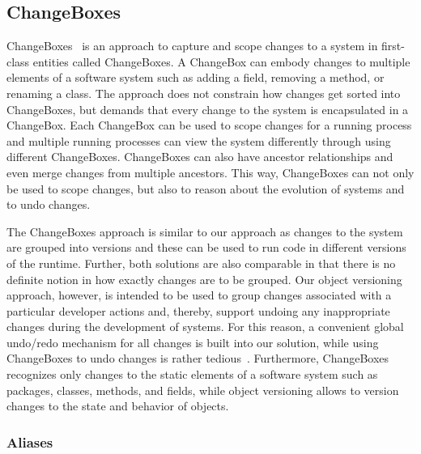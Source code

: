 \subsection{ChangeBoxes}

ChangeBoxes~\cite{Denker2007EEC} is an approach to capture and scope changes to a system in first-class entities called ChangeBoxes.
A ChangeBox can embody changes to multiple elements of a software system such as adding a field, removing a method, or renaming a class.
The approach does not constrain how changes get sorted into ChangeBoxes, but demands that every change to the system is encapsulated in a ChangeBox.
Each ChangeBox can be used to scope changes for a running process and multiple running processes can view the system differently through using different ChangeBoxes.
ChangeBoxes can also have ancestor relationships and even merge changes from multiple ancestors.
This way, ChangeBoxes can not only be used to scope changes, but also to reason about the evolution of systems and to undo changes.

The ChangeBoxes approach is similar to our approach as changes to the system are grouped into versions and these can be used to run code in different versions of the runtime.
Further, both solutions are also comparable in that there is no definite notion in how exactly changes are to be grouped.
Our object versioning approach, however, is intended to be used to group changes associated with a particular developer actions and, thereby, support undoing any inappropriate changes during the development of systems.
For this reason, a convenient global undo/redo mechanism for all changes is built into our solution, while using ChangeBoxes to undo changes is rather tedious~\cite{Steinert2012COE}.
Furthermore, ChangeBoxes recognizes only changes to the static elements of a software system such as packages, classes, methods, and fields, while object versioning allows to version changes to the state and behavior of objects.


\subsubsection{Aliases}


